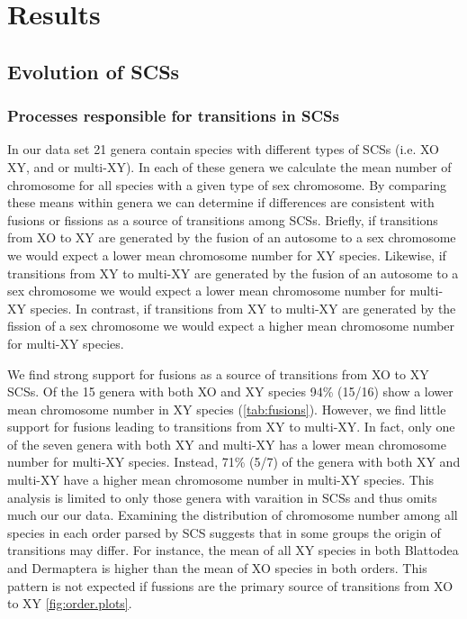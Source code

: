 \section{Results}

\subsection{Evolution of SCSs}
\subsubsection{Processes responsible for transitions in SCSs}
In our data set 21 genera contain species with different types of SCSs (i.e. XO XY, and or multi-XY).
In each of these genera we calculate the mean number of chromosome for all species with a given type of sex chromosome.
By comparing these means within genera we can determine if differences are consistent with fusions or fissions as a source of transitions among SCSs.
Briefly, if transitions from XO to XY are generated by the fusion of an autosome to a sex chromosome we would expect a lower mean chromosome number for XY species.
Likewise, if transitions from XY to multi-XY are generated by the fusion of an autosome to a sex chromosome we would expect a lower mean chromosome number for multi-XY species.
In contrast, if transitions from XY to multi-XY are generated by the fission of a sex chromosome we would expect a higher mean chromosome number for multi-XY species.

We find strong support for fusions as a source of transitions from XO to XY SCSs.
Of the 15 genera with both XO and XY species 94\% (15/16) show a lower mean chromosome number in XY species (\cref{tab:fusions}). 
However, we find little support for fusions leading to transitions from XY to multi-XY.
In fact, only one of the seven genera with both XY and multi-XY has a lower mean chromosome number for multi-XY species.
Instead, 71\% (5/7) of the genera with both XY and multi-XY have a higher mean chromosome number in multi-XY species.
This analysis is limited to only those genera with varaition in SCSs and thus omits much our our data.
Examining the distribution of chromosome number among all species in each order parsed by SCS suggests that in some groups the origin of transitions may differ.
For instance, the mean of all XY species in both Blattodea and Dermaptera is higher than the mean of XO species in both orders.
This pattern is not expected if fussions are the primary source of transitions from XO to XY \cref{fig:order.plots}.

